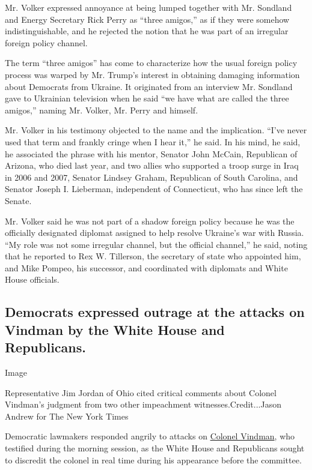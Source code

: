 Mr. Volker expressed annoyance at being lumped together with Mr.
Sondland and Energy Secretary Rick Perry as ``three amigos,'' as if they
were somehow indistinguishable, and he rejected the notion that he was
part of an irregular foreign policy channel.

The term ``three amigos'' has come to characterize how the usual foreign
policy process was warped by Mr. Trump's interest in obtaining damaging
information about Democrats from Ukraine. It originated from an
interview Mr. Sondland gave to Ukrainian television when he said ``we
have what are called the three amigos,'' naming Mr. Volker, Mr. Perry
and himself.

Mr. Volker in his testimony objected to the name and the implication.
``I've never used that term and frankly cringe when I hear it,'' he
said. In his mind, he said, he associated the phrase with his mentor,
Senator John McCain, Republican of Arizona, who died last year, and two
allies who supported a troop surge in Iraq in 2006 and 2007, Senator
Lindsey Graham, Republican of South Carolina, and Senator Joseph I.
Lieberman, independent of Connecticut, who has since left the Senate.

Mr. Volker said he was not part of a shadow foreign policy because he
was the officially designated diplomat assigned to help resolve
Ukraine's war with Russia. ``My role was not some irregular channel, but
the official channel,'' he said, noting that he reported to Rex W.
Tillerson, the secretary of state who appointed him, and Mike Pompeo,
his successor, and coordinated with diplomats and White House officials.

\hypertarget{democrats-expressed-outrage-at-the-attacks-on-vindman-by-the-white-house-and-republicans}{%
\subsection{Democrats expressed outrage at the attacks on Vindman by the
White House and
Republicans.}\label{democrats-expressed-outrage-at-the-attacks-on-vindman-by-the-white-house-and-republicans}}

Image

Representative Jim Jordan of Ohio cited critical comments about Colonel
Vindman's judgment from two other impeachment witnesses.Credit...Jason
Andrew for The New York Times

Democratic lawmakers responded angrily to attacks on
\href{https://www.nytimes.com/2019/11/19/us/alexander-vindman.html}{Colonel
Vindman}, who testified during the morning session, as the White House
and Republicans sought to discredit the colonel in real time during his
appearance before the committee.

